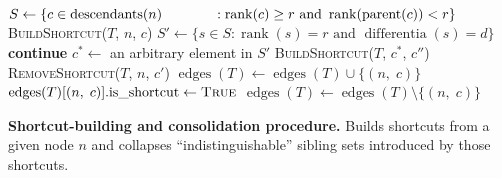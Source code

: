 
 \begin{algorithm}[h]
  \begin{algorithmic}[1]
  \small{
      \State $S \gets \{c \in \operatorname{descendants}(n) \\~~~~~~~~~~~: \operatorname{rank}(c) \ge r \text{ and }  \operatorname{rank}(\operatorname{parent}(c)) < r\}$
        \textsc{BuildShortcut}($T$, $n$, $c$)
      \EndFor
        \State $S' \gets \{s \in S : \operatorname{rank}(s) = r \text{ and } \operatorname{differentia}(s) = d\}$
          \State \textbf{continue}
        \EndIf
        \State $c^* \gets$ an arbitrary element in $S'$
            \State \textsc{BuildShortcut}($T$, $c^*$, $c''$)
          \EndFor
          \State \textsc{RemoveShortcut}($T$, $n$, $c'$)
        \EndFor
      \EndFor
    \EndFunction
      \State $\operatorname{edges}(T) \gets \operatorname{edges}(T) \cup \{(n,\; c)\}$
      \State $\operatorname{edges}(T)[(n,\; c)]\text{.is\_shortcut} \gets \textsc{True}$
    \EndFunction
        \State $\operatorname{edges}(T) \gets \operatorname{edges}(T) \setminus \{(n,\; c)\}$
    \EndFunction
  }
  \end{algorithmic}
  \caption{\textbf{Shortcut-building and consolidation procedure.} \small Builds shortcuts from a given node $n$ and collapses ``indistinguishable'' sibling sets introduced by those shortcuts. \vspace{-1.5em}}
  \label{alg:consolidation}
\end{algorithm}
